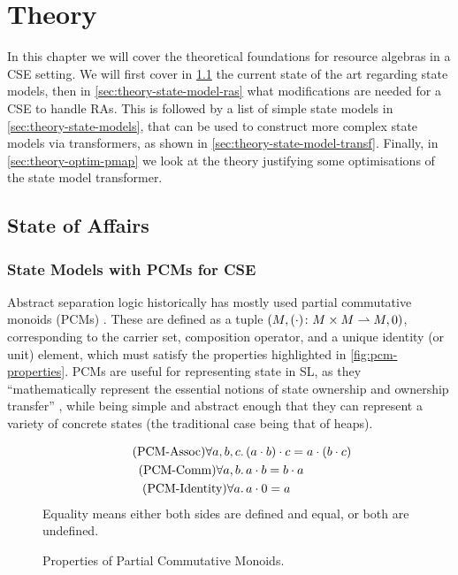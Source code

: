 \chapter{Theory} \label{chap:theory}

In this chapter we will cover the theoretical foundations for resource algebras in a CSE setting. We will first cover in \cref{sec:theory-state-of-affairs} the current state of the art regarding state models, then in \cref{sec:theory-state-model-ras} what modifications are needed for a CSE to handle RAs. This is followed by a list of simple state models in \cref{sec:theory-state-models}, that can be used to construct more complex state models via transformers, as shown in \cref{sec:theory-state-model-transf}. Finally, in \cref{sec:theory-optim-pmap} we look at the theory justifying some optimisations of the \PMap{} state model transformer.

\section{State of Affairs} \label{sec:theory-state-of-affairs}

\subsection{State Models with PCMs for CSE}

Abstract separation logic historically has mostly used partial commutative monoids (PCMs) \cite{abstractseplogic,sepalgebra,iris1,higherorderseplogic}. These are defined as a tuple ${(M, (\cdot)\colon M\times M\rightharpoonup M, 0)}$, corresponding to the carrier set, composition operator, and a unique identity (or unit) element, which must satisfy the properties highlighted in \autoref{fig:pcm-properties}. PCMs are useful for representing state in SL, as they ``mathematically represent the essential notions of state ownership and ownership transfer'' \cite{abstractpcm}, while being simple and abstract enough that they can represent a variety of concrete states (the traditional case being that of heaps).

\begin{figure}
	\centering
	\begin{align*}
	\tag{PCM-Assoc} \forall a,b,c&\ldotp (a\cdot b)\cdot c = a\cdot (b\cdot c)\\
	\tag{PCM-Comm} \forall a,b&\ldotp a\cdot b = b\cdot a\\
	\tag{PCM-Identity} \forall a&\ldotp a\cdot 0 = a
	\end{align*}
	Equality means either both sides are defined and equal, or both are undefined.
	\caption{Properties of Partial Commutative Monoids.}
	\label{fig:pcm-properties}
\end{figure}

